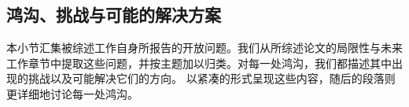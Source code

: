 \documentclass[11pt]{article}
\begin{document}

\subsection{鸿沟、挑战与可能的解决方案}
\label{subsec:gaps}
本小节汇集被综述工作自身所报告的开放问题。我们从所综述论文的局限性与未来工作章节中提取这些问题，并按主题加以归类。对每一处鸿沟，我们都描述其中出现的挑战以及可能解决它们的方向。 以紧凑的形式呈现这些内容，随后的段落则更详细地讨论每一处鸿沟。
\end{document}
